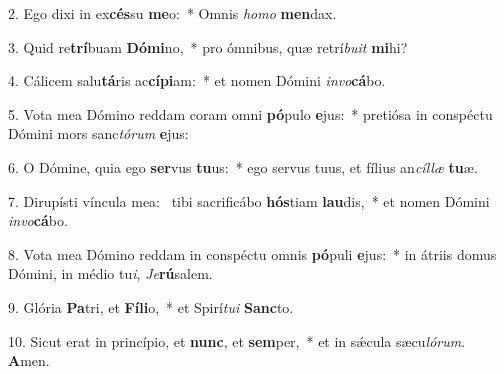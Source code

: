 2. Ego dixi in ex\textbf{cés}su \textbf{me}o:~*  Omnis \textit{ho}\textit{mo} \textbf{men}dax.\

3. Quid re\textbf{trí}buam \textbf{Dó}\textbf{mi}no,~*  pro ómnibus, quæ retrí\textit{bu}\textit{it} \textbf{mi}hi?\

4. Cálicem salu\textbf{tá}ris ac\textbf{cí}\textbf{pi}am:~*  et nomen Dómini \textit{in}\textit{vo}\textbf{cá}bo.\

5. Vota mea Dómino reddam coram omni \textbf{pó}pulo \textbf{e}jus:~*  pretiósa in conspéctu Dómini mors sanc\textit{tó}\textit{rum} \textbf{e}jus:\

6. O Dómine, quia ego \textbf{ser}vus \textbf{tu}us:~*  ego servus tuus, et fílius an\textit{cíl}\textit{læ} \textbf{tu}æ.\

7. Dirupísti víncula mea: \dag\  tibi sacrificábo \textbf{hós}tiam \textbf{lau}dis,~*  et nomen Dómini \textit{in}\textit{vo}\textbf{cá}bo.\

8. Vota mea Dómino reddam in conspéctu omnis \textbf{pó}puli \textbf{e}jus:~*  in átriis domus Dómini, in médio tu\textit{i}, \textit{Je}\textbf{rú}salem.\

9. Glória \textbf{Pa}tri, et \textbf{Fí}\textbf{li}o,~*  et Spirí\textit{tu}\textit{i} \textbf{Sanc}to.\

10. Sicut erat in princípio, et \textbf{nunc}, et \textbf{sem}per,~*  et in sǽcula sæcu\textit{ló}\textit{rum}. \textbf{A}men.\

